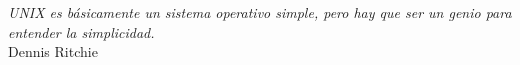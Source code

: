 \newpage
\bigskip
\bigskip
\begin{flushright}
\emph{UNIX es básicamente un sistema operativo simple, pero hay que ser un genio para entender la simplicidad.}\\
Dennis Ritchie
\end{flushright}
